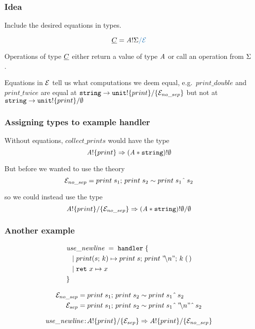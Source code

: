 \documentclass[usenames,dvipsnames]{beamer}
\begin{document}
\begin{frame}
	\frametitle{Idea}
	Include the desired equations in types.

  \[
    \ctyC = \tyA \bang \sig \new{\witheq \eqE}
  \]

  Operations of type $\underline{C}$ either return a value of type $\mathit{A}$ or call an operation from $\Sigma$ .
  \vspace{5mm}

  Equations in $\mathcal{E}$ tell us what computations we deem equal, e.g.\ $print\_double$ and $print\_twice$ are equal at $\mathtt{string} \to \ctype{\unittype}{\set{print}}{\set{\eqE_{no\_sep}}}$ but not at $\mathtt{string} \to \ctype{\unittype}{\set{print}}{\nil}$
\end{frame}
\begin{frame}
	\frametitle{Assigning types to example handler}

	Without equations, $\mathit{collect\_prints}$ would have the type
	\[
		{\mathit{A}}!{\{{print}\}} \Rightarrow {(\mathit{A}* \mathtt{string})}!{\emptyset}
	\]

	\pause

	But before we wanted to use the theory
	\begin{equation*}
		\mathcal{E}_{no\_sep} = {print}\;{s_1};\, {print}\;{s_2} \sim {print}\;{s_1  \;\hat{}\; \, s_2}
	\end{equation*}

	so we could instead use the type
	\[
		\ctype{\tyA}{\set{print}}{\set{\eqE_{no\_sep}}} \hto \ctype{(\tyA * \mathtt{string})}{\nil}{\nil}
	\]

\end{frame}
\begin{frame}
	\frametitle{Another example}
	\begin{align*}
		&\mathit{use\_newline} \; = \; \keyhandler \; \{ \\
		&\tab | \; \operation[print]{s}{k} \mapsto \apply{print}{s};\,\apply{print}{"\!\backslash n"};\, \apply{k}{\unit}\\
		&\tab | \; \return{x} \mapsto x \\
		&\}
	\end{align*}

	\begin{align*}
		\mathcal{E}_{no\_sep} &= {print}\;{s_1};\,{print}\;{s_2} \sim {print}\;{s_1 \;\hat{}\;\, s_2}\\
		\mathcal{E}_{sep} &= {print}\;{s_1};\,{print}\;{s_2} \sim {print}\;{s_1 \;\hat{}\;\, "\!\backslash n" \;\hat{}\; \, s_2}	
	\end{align*}

	\[
		\mathit{use\_newline} \oftype \ctype{\tyA}{\set{print}}{\set{\eqE_{sep}}} \hto \ctype{\tyA}{\set{print}}{\set{\eqE_{no\_sep}}}
	\]

\end{frame}
\end{document}
